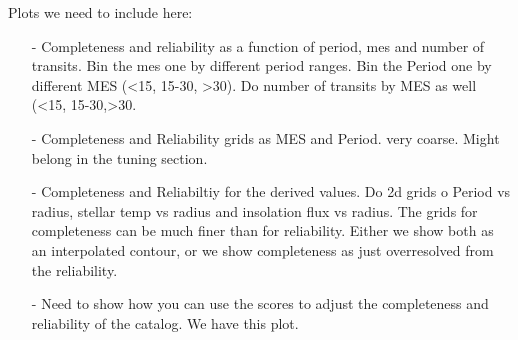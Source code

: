 Plots we need to include here:
\begin{itemize}
\item[-] Completeness and reliability as a function of period, mes and number of transits. Bin the mes one by different period ranges. Bin the Period one by different MES (<15, 15-30, >30). Do number of transits by MES as well (<15, 15-30,>30.  

\item[-] Completeness and Reliability grids as MES and Period. very coarse. Might belong in the tuning section.

\item[-] Completeness and Reliabiltiy for the derived values.
Do 2d grids o Period vs radius, stellar temp vs radius and insolation flux vs radius.  The grids for completeness can be much finer than for reliability.  Either we show both as an interpolated contour, or we show completeness as just overresolved from the reliability. 

\item[-] Need to show how you can use the scores to adjust the completeness and reliability of the catalog. We have this plot.
\end{itemize}
